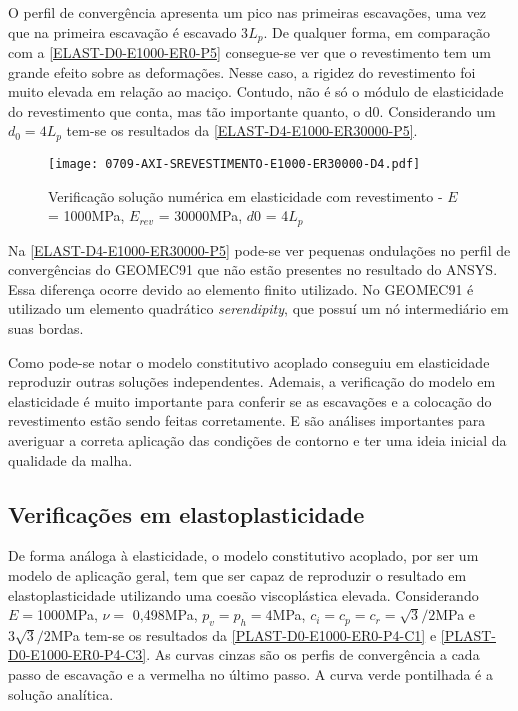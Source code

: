 O perfil de convergência apresenta um pico nas primeiras escavações, uma vez que na primeira escavação é escavado 3$L_p$. De qualquer forma, em comparação com a \autoref{ELAST-D0-E1000-ER0-P5} consegue-se ver que o revestimento tem um grande efeito sobre as deformações. Nesse caso, a rigidez do revestimento foi muito elevada em relação ao maciço. Contudo, não é só o módulo de elasticidade do revestimento que conta, mas tão importante quanto, o d0. Considerando um $d_0=4L_p$ tem-se os resultados da \autoref{ELAST-D4-E1000-ER30000-P5}.

\begin{figure}[H]
	\begin{center}
		\texttt{[image: 0709-AXI-SREVESTIMENTO-E1000-ER30000-D4.pdf]}
	\end{center}
	\caption{\label{ELAST-D4-E1000-ER30000-P5}Verificação solução numérica em elasticidade com revestimento - $E$ = 1000MPa, $E_{rev}$ = 30000MPa, $d0$ = 4$L_p$}
\end{figure}

Na \autoref{ELAST-D4-E1000-ER30000-P5} pode-se ver pequenas ondulações no perfil de convergências do GEOMEC91 que não estão presentes no resultado do ANSYS. Essa diferença ocorre devido ao elemento finito utilizado. No GEOMEC91 é utilizado um elemento quadrático \textit{serendipity}, que possuí um nó intermediário em suas bordas.

Como pode-se notar o modelo constitutivo acoplado conseguiu em elasticidade reproduzir outras soluções independentes. Ademais, a verificação do modelo em elasticidade é muito importante para conferir se as escavações e a colocação do revestimento estão sendo feitas corretamente. E são análises importantes para averiguar a correta aplicação das condições de contorno e ter uma ideia inicial da qualidade da malha.

\subsection{Verificações em elastoplasticidade}

De forma análoga à elasticidade, o modelo constitutivo acoplado, por ser um modelo de aplicação geral, tem que ser capaz de reproduzir o resultado em elastoplasticidade utilizando uma coesão viscoplástica elevada. Considerando $E =$1000MPa, $\nu =$ 0,498MPa, $p_v = p_h = 4$MPa, $c_i=c_p=c_r = \sqrt{3}/2$MPa e $3\sqrt{3}/2$MPa  tem-se os resultados da \autoref{PLAST-D0-E1000-ER0-P4-C1} e \autoref{PLAST-D0-E1000-ER0-P4-C3}. As curvas cinzas são os perfis de convergência a cada passo de escavação e a vermelha no último passo. A curva verde pontilhada é a solução analítica.

